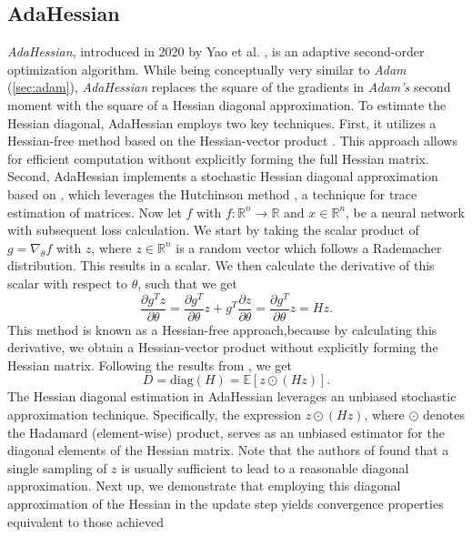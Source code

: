 \subsection{AdaHessian}
\label{sec:adahessian}
\emph{AdaHessian}, introduced in 2020 by Yao et al. \cite{yao2021adahessian}, is an adaptive second-order optimization algorithm.
While being conceptually very similar to \emph{Adam} (\ref{sec:adam}), \emph{AdaHessian} replaces the square of the gradients
in \emph{Adam's} second moment with the square of a Hessian diagonal approximation.
To estimate the Hessian diagonal, AdaHessian employs two key techniques.
First, it utilizes a Hessian-free method based on the Hessian-vector product \cite{pearlmutter1994fast}.
This approach allows for efficient computation without explicitly forming the full Hessian matrix.
Second, AdaHessian implements a stochastic Hessian diagonal approximation based on \cite{BEKAS20071214},
which leverages the Hutchinson method \cite{hutchinson}, a technique for trace estimation of matrices.
Now let $f$ with $f: \mathbb{R}^n \to \mathbb{R}$ and $x \in \mathbb{R}^n$, be a neural network with subsequent
loss calculation. We start by taking the scalar product of $g=\nabla_\theta f$ with $z$, where
$z\in \mathbb{R}^n$ is a random vector which follows a Rademacher distribution. This results in a scalar.
We then calculate the derivative of this scalar with respect to $\theta$, such that we get
\begin{equation}
 \frac{\partial g^T z}{\partial \theta} = \frac{\partial g^T}{\partial \theta} z + g^T \frac{\partial z}{\partial \theta} = \frac{\partial g^T}{\partial \theta} z = Hz.
\end{equation}
This method is known as a Hessian-free approach,because by calculating this derivative, we obtain a Hessian-vector product without explicitly forming the Hessian matrix.
Following the results from  \cite{BEKAS20071214}, we get
\begin{equation}
    D = \text{diag}(H) = \mathbb{E}[z \odot (Hz)].
\end{equation}
The Hessian diagonal estimation in AdaHessian leverages an unbiased stochastic approximation technique.
Specifically, the expression $z \odot (Hz)$, where $\odot$ denotes the Hadamard (element-wise) product, serves as an unbiased estimator for the diagonal elements of the Hessian matrix.
Note that the authors of \cite{yao2021adahessian} found that a single sampling of $z$ is usually sufficient to lead to a reasonable diagonal approximation.
Next up, we demonstrate that employing this diagonal approximation of the Hessian in the update step yields convergence properties equivalent to those achieved
